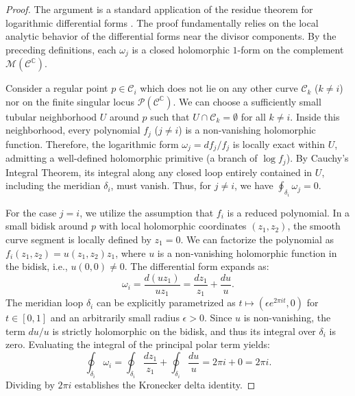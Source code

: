 \documentclass[article,11pt]{amsart} \numberwithin{equation}{section}
\numberwithin{equation}{section}
\begin{document}
{\begin{proof}
	The argument is a standard application of the residue theorem for logarithmic differential forms
	\cite{Brieskorn1973,Deligne71,Saito80,Dupont2015,CogolludoMatei2012}.
	The proof fundamentally relies on the local analytic behavior of the differential forms near the divisor components. By the preceding definitions, each $\omega_j$ is a closed holomorphic $1$-form on the complement $\mathcal{M}(\mathcal{C}^\mathbb{C})$.
	
	Consider a regular point $p \in \mathscr{C}_i$ which does not lie on any other curve $\mathscr{C}_k$ ($k \neq i$) nor on the finite singular locus $\mathcal{P}(\mathcal{C}^\mathbb{C})$. We can choose a sufficiently small tubular neighborhood $U$ around $p$ such that $U \cap \mathscr{C}_k = \emptyset$ for all $k \neq i$. Inside this neighborhood, every polynomial $f_j$ ($j \neq i$) is a non-vanishing holomorphic function. Therefore, the logarithmic form $\omega_j = df_j / f_j$ is locally exact within $U$, admitting a well-defined holomorphic primitive (a branch of $\log f_j$). By Cauchy's Integral Theorem, its integral along any closed loop entirely contained in $U$, including the meridian $\delta_i$, must vanish. Thus, for $j \neq i$, we have $\oint_{\delta_i} \omega_j = 0$.
	
	For the case $j = i$, we utilize the assumption that $f_i$ is a reduced polynomial. In a small bidisk around $p$ with local holomorphic coordinates $(z_1, z_2)$, the smooth curve segment is locally defined by $z_1 = 0$. We can factorize the polynomial as $f_i(z_1, z_2) = u(z_1, z_2) z_1$, where $u$ is a non-vanishing holomorphic function in the bidisk, i.e., $u(0,0) \neq 0$. The differential form expands as:
	\[ \omega_i = \frac{d(u z_1)}{u z_1} = \frac{dz_1}{z_1} + \frac{du}{u}. \]
	The meridian loop $\delta_i$ can be explicitly parametrized as $t \longmapsto (\epsilon e^{2\pi i t}, 0)$ for $t \in [0,1]$ and an arbitrarily small radius $\epsilon > 0$. Since $u$ is non-vanishing, the term $du/u$ is strictly holomorphic on the bidisk, and thus its integral over $\delta_i$ is zero. Evaluating the integral of the principal polar term yields:
	\[ \oint_{\delta_i} \omega_i = \oint_{\delta_i} \frac{dz_1}{z_1} + \oint_{\delta_i} \frac{du}{u} = 2\pi i + 0 = 2\pi i. \]
	Dividing by $2\pi i$ establishes the Kronecker delta identity.
	

\end{proof}}
\end{document}
